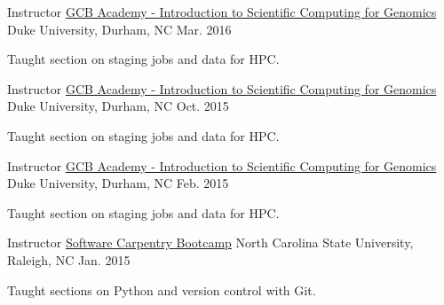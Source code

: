 

\begin{cventries}

  \cventry
    {Instructor} %
    {\href{http://duke-gcb.github.io/SciComp-Mar-2016/}{GCB Academy - Introduction to Scientific Computing for Genomics}} %
    {Duke University, Durham, NC} %
    {Mar. 2016} %
    {
      \begin{cvitems} %
        \item {Taught section on staging jobs and data for HPC.}
      \end{cvitems}
    }

  \cventry
    {Instructor} %
    {\href{http://duke-gcb.github.io/SciComp-Oct-2015/}{GCB Academy - Introduction to Scientific Computing for Genomics}} %
    {Duke University, Durham, NC} %
    {Oct. 2015} %
    {
      \begin{cvitems} %
        \item {Taught section on staging jobs and data for HPC.}
      \end{cvitems}
    }

  \cventry
    {Instructor} %
    {\href{http://duke-gcb.github.io/SciComp-Feb-2015/}{GCB Academy - Introduction to Scientific Computing for Genomics}} %
    {Duke University, Durham, NC} %
    {Feb. 2015} %
    {
      \begin{cvitems} %
        \item {Taught section on staging jobs and data for HPC.}
      \end{cvitems}
    }

  \cventry
    {Instructor} %
    {\href{http://kcranston.github.io/2015-01-29-ncsu/}{Software Carpentry Bootcamp}} %
    {North Carolina State University, Raleigh, NC} %
    {Jan. 2015} %
    {
      \begin{cvitems} %
        \item {Taught sections on Python and version control with Git.}
      \end{cvitems}
    }


\end{cventries}
